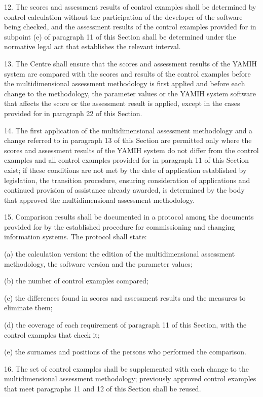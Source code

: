 \documentclass[14pt,a4paper]{extarticle}
\newcommand{\norm}[1]{\par\noindent\hspace*{1.27cm}#1. }
\newcommand{\sub}[1]{\par\noindent\hspace*{1.27cm}#1 }
\begin{document}
\norm{12}The scores and assessment results of control examples shall be determined by control calculation without the participation of the developer of the software being checked, and the assessment results of the control examples provided for in subpoint (e) of paragraph 11 of this Section shall be determined under the normative legal act that establishes the relevant interval.

\norm{13}The Centre shall ensure that the scores and assessment results of the YAMIH system are compared with the scores and results of the control examples before the multidimensional assessment methodology is first applied and before each change to the methodology, the parameter values or the YAMIH system software that affects the score or the assessment result is applied, except in the cases provided for in paragraph 22 of this Section.

\norm{14}The first application of the multidimensional assessment methodology and a change referred to in paragraph 13 of this Section are permitted only where the scores and assessment results of the YAMIH system do not differ from the control examples and all control examples provided for in paragraph 11 of this Section exist; if these conditions are not met by the date of application established by legislation, the transition procedure, ensuring consideration of applications and continued provision of assistance already awarded, is determined by the body that approved the multidimensional assessment methodology.

\norm{15}Comparison results shall be documented in a protocol among the documents provided for by the established procedure for commissioning and changing information systems. The protocol shall state:
\sub{(a)}the calculation version: the edition of the multidimensional assessment methodology, the software version and the parameter values;
\sub{(b)}the number of control examples compared;
\sub{(c)}the differences found in scores and assessment results and the measures to eliminate them;
\sub{(d)}the coverage of each requirement of paragraph 11 of this Section, with the control examples that check it;
\sub{(e)}the surnames and positions of the persons who performed the comparison.

\norm{16}The set of control examples shall be supplemented with each change to the multidimensional assessment methodology; previously approved control examples that meet paragraphs 11 and 12 of this Section shall be reused.
\end{document}
